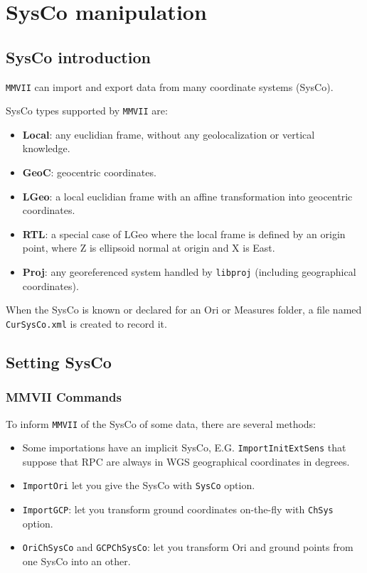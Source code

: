 \chapter{SysCo manipulation}
\label{Chap:SysCo}



\section{SysCo introduction}

{\tt MMVII} can import and export data from many coordinate systems (SysCo).

SysCo types supported by {\tt MMVII} are:
\begin{itemize}
\item \textbf{Local}: any euclidian frame, without any geolocalization or vertical knowledge.
\item \textbf{GeoC}: geocentric coordinates.
\item \textbf{LGeo}: a local euclidian frame with an affine transformation into geocentric coordinates.
\item \textbf{RTL}: a special case of LGeo where the local frame is defined by an origin point, where Z is ellipsoid normal at origin and X is East.
\item \textbf{Proj}: any georeferenced system handled by {\tt libproj} (including geographical coordinates).
\end{itemize}

When the SysCo is known or declared for an Ori or Measures folder, a file named {\tt CurSysCo.xml}
is created to record it.

\section{Setting SysCo}

\subsection{MMVII Commands}
To inform {\tt MMVII} of the SysCo of some data, there are several methods:

\begin{itemize}
\item Some importations have an implicit SysCo, E.G. {\tt ImportInitExtSens} that suppose that RPC are always in WGS geographical coordinates in degrees.
\item {\tt ImportOri} let you give the SysCo with {\tt SysCo} option.
\item {\tt ImportGCP}: let you transform ground coordinates on-the-fly with {\tt ChSys} option.
\item {\tt OriChSysCo} and {\tt GCPChSysCo}: let you transform Ori and ground points from one SysCo into an other.
\end{itemize}

